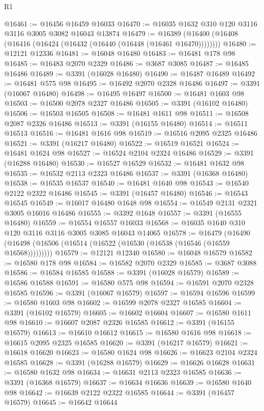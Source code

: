 \begin{lexlean}{R1}
\begin{coremodule}
@16461 := @16456 @16459 @16033
@16470 := @16035 @1632 @310 @120 @3116 @3116 @3005 @3082 @16043 @13874
@16479 := @16389 (@16400 (@16408 (@16416 (@16424 (@16432 (@16440 (@16448 (@16461 @16470))))))))
@16480 := @12121 @12336
@16481 := @16048 @16480
@16483 := @16481 @178 @98
@16485 := @16483 @2070 @2329
@16486 := @3687 @3085
@16487 := @16485 @16486
@16489 := @3391 (@16028 @16480)
@16490 := @16487 @16489
@16492 := @16481 @575 @98
@16495 := @16492 @2070 @2328 @16486
@16497 := @3391 (@16067 @16480)
@16498 := @16495 @16497
@16500 := @16481 @1603 @98
@16503 := @16500 @2078 @2327 @16486
@16505 := @3391 (@16102 @16480)
@16506 := @16503 @16505
@16508 := @16481 @1611 @98
@16511 := @16508 @2087 @2326 @16486
@16513 := @3391 (@16155 @16480)
@16514 := @16511 @16513
@16516 := @16481 @1616 @98
@16519 := @16516 @2095 @2325 @16486
@16521 := @3391 (@16217 @16480)
@16522 := @16519 @16521
@16524 := @16481 @1624 @98
@16527 := @16524 @2104 @2324 @16486
@16529 := @3391 (@16288 @16480)
@16530 := @16527 @16529
@16532 := @16481 @1632 @98
@16535 := @16532 @2113 @2323 @16486
@16537 := @3391 (@16368 @16480)
@16538 := @16535 @16537
@16540 := @16481 @1640 @98
@16543 := @16540 @2122 @2322 @16486
@16545 := @3391 (@16457 @16480)
@16546 := @16543 @16545
@16549 := @16017 @16480 @1648 @98
@16554 := @16549 @2131 @2321 @3005 @16016 @16486
@16555 := @3392 @1648
@16557 := @3391 (@16555 @16480)
@16559 := @16554 @16557 @16033
@16568 := @16035 @1640 @310 @120 @3116 @3116 @3005 @3085 @16043 @14065
@16578 := @16479
    (@16490 (@16498 (@16506 (@16514 (@16522 (@16530 (@16538 (@16546 (@16559 @16568)))))))))
@16579 := @12121 @12340
@16580 := @16048 @16579
@16582 := @16580 @178 @98
@16584 := @16582 @2070 @2329
@16585 := @3687 @3088
@16586 := @16584 @16585
@16588 := @3391 (@16028 @16579)
@16589 := @16586 @16588
@16591 := @16580 @575 @98
@16594 := @16591 @2070 @2328 @16585
@16596 := @3391 (@16067 @16579)
@16597 := @16594 @16596
@16599 := @16580 @1603 @98
@16602 := @16599 @2078 @2327 @16585
@16604 := @3391 (@16102 @16579)
@16605 := @16602 @16604
@16607 := @16580 @1611 @98
@16610 := @16607 @2087 @2326 @16585
@16612 := @3391 (@16155 @16579)
@16613 := @16610 @16612
@16615 := @16580 @1616 @98
@16618 := @16615 @2095 @2325 @16585
@16620 := @3391 (@16217 @16579)
@16621 := @16618 @16620
@16623 := @16580 @1624 @98
@16626 := @16623 @2104 @2324 @16585
@16628 := @3391 (@16288 @16579)
@16629 := @16626 @16628
@16631 := @16580 @1632 @98
@16634 := @16631 @2113 @2323 @16585
@16636 := @3391 (@16368 @16579)
@16637 := @16634 @16636
@16639 := @16580 @1640 @98
@16642 := @16639 @2122 @2322 @16585
@16644 := @3391 (@16457 @16579)
@16645 := @16642 @16644

\end{coremodule}
\end{lexlean}
